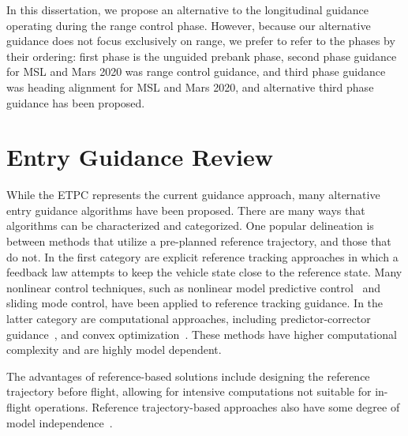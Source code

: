  

In this dissertation, we propose an alternative to the longitudinal guidance operating during the range control phase. However, because our alternative guidance does not focus exclusively on range, we prefer to refer to the phases by their ordering: first phase is the unguided prebank phase, second phase guidance for MSL and Mars 2020 was range control guidance, and third phase guidance was heading alignment for MSL and Mars 2020, and alternative third phase guidance has been proposed. 


\section{Entry Guidance Review}
While the ETPC represents the current guidance approach, many alternative entry guidance algorithms have been proposed. There are many ways that algorithms can be characterized and categorized. One popular delineation is between methods that utilize a pre-planned reference trajectory, and those that do not. In the first category are explicit reference tracking approaches in which a feedback law attempts to keep the vehicle state close to the reference state. Many nonlinear control techniques, such as nonlinear model predictive control~\cite{JoelController} and sliding mode control, have been applied to reference tracking guidance. In the latter category are computational approaches, including predictor-corrector guidance~\cite{EntryPredictCorrect}, and convex optimization~\cite{MaxCrossrangeConvexLu,ConvexEntryGuidance}. These methods have higher computational complexity and are highly model dependent.

The advantages of reference-based solutions include designing the reference trajectory before flight, allowing for intensive computations not suitable for in-flight operations. Reference trajectory-based approaches also have some degree of model independence~\cite{joel_dissertation}.

